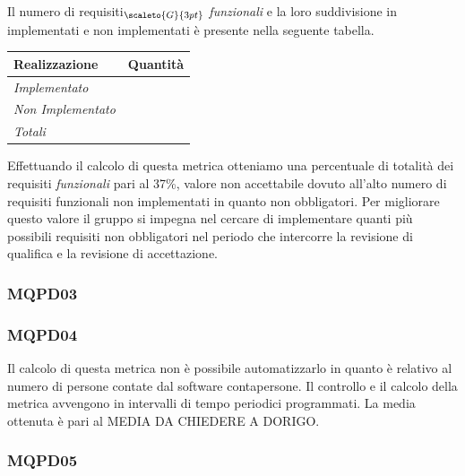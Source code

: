 {{{{{Il numero di requisiti$_{\scaleto{G}{3pt}}$ \textit{funzionali} e la loro suddivisione in implementati e non implementati è presente nella seguente tabella.

\quad
\def\tabularxcolumn#1{m{#1}}
{
	\begin{center}
		\renewcommand{\arraystretch}{1.4}
		\begin{longtable}[c]{|p{4cm}|p{3cm}|}
			\hline
			\rowcolor{airforceblue}
			\textbf{Realizzazione} & \textbf{Quantità}\\
			\hline
			\textit{Implementato} & \makecell[c]{35}\\
			\hline
			\textit{Non Implementato} & \makecell[c]{22} \\
			\hline
			\textit{Totali} & \makecell[c]{57} \\
		\end{longtable}
	\end{center}

Effettuando il calcolo di questa metrica otteniamo una percentuale di totalità dei requisiti \textit{funzionali} pari al 37\%, valore non accettabile dovuto all'alto numero di requisiti funzionali non implementati in quanto non obbligatori. Per migliorare questo valore il gruppo si impegna nel cercare di implementare quanti più possibili requisiti non obbligatori nel periodo che intercorre la revisione di qualifica e la revisione di accettazione.

\subsubsection{MQPD03}\label{ResocontoAttivitàDiVerificaRevisioneDiQualificaVerificheDiProcessoMQPD03}

\subsubsection{MQPD04}\label{ResocontoAttivitàDiVerificaRevisioneDiQualificaVerificheDiProcessoMQPD04}

Il calcolo di questa metrica non è possibile automatizzarlo in quanto è relativo al numero di persone contate dal software contapersone. Il controllo e il calcolo della metrica avvengono in intervalli di tempo periodici programmati. La media ottenuta è pari al MEDIA DA CHIEDERE A DORIGO.

\subsubsection{MQPD05}\label{ResocontoAttivitàDiVerificaRevisioneDiQualificaVerificheDiProcessoMQPD05}

}}}}}}
